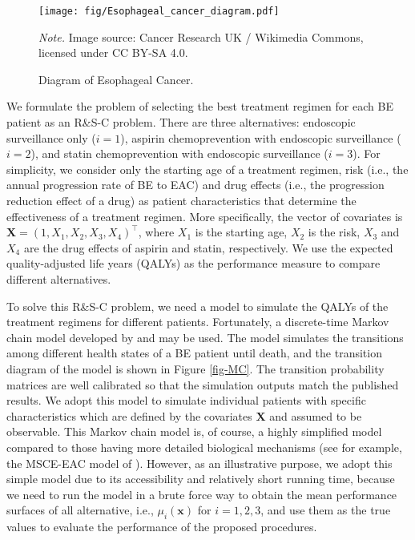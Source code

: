 \documentclass[ijoc,nonblindrev]{informs3}
\def\bx{{\bm x}}
\def\bX{{\bm X}}
\begin{document}
\begin{figure}%
\centering
\texttt{[image: fig/Esophageal\_cancer\_diagram.pdf]}
\caption{Diagram of Esophageal Cancer.}  \label{fig-cancer}
\begin{minipage}[t]{1\linewidth}
\SingleSpacedXI
\vspace{-1.2em}
\footnotesize{
\emph{Note.} \textsf{Image source: Cancer Research UK / Wikimedia Commons, licensed under CC BY-SA 4.0.}
}
\end{minipage}
\end{figure}

We formulate the problem of selecting the best treatment regimen for each BE patient as an R\&S-C problem.
There are three alternatives: endoscopic surveillance only ($i=1$), aspirin chemoprevention with endoscopic surveillance ($i=2$), and statin chemoprevention with endoscopic surveillance ($i=3$).
For simplicity, we consider only the starting age of a treatment regimen, risk (i.e., the annual progression rate of BE to EAC) and drug effects (i.e., the progression reduction effect of a drug) as patient characteristics that determine the effectiveness of a treatment regimen.
More specifically, the vector of covariates is $\bX=(1,X_1, X_2, X_3,X_4)^\intercal $, where $X_1$ is the starting age, $X_2$ is the risk, $X_3$ and $X_4$ are the drug effects of aspirin and statin, respectively.
We use the expected quality-adjusted life years (QALYs) as the performance measure to compare different alternatives.


To solve this R\&S-C problem, we need a model to simulate the QALYs of the treatment regimens for different patients.
Fortunately, a discrete-time Markov chain model developed by \cite{hur2004} and \cite{choi2014} may be used.
The model simulates the transitions among different health states of a BE patient until death, and the transition diagram of the model is shown in Figure \ref{fig-MC}.
The transition probability matrices are well calibrated so that the simulation outputs match the published results.
We adopt this model to simulate individual patients with specific characteristics which are defined by the covariates $\bX$ and assumed to be observable.
This Markov chain model is, of course, a highly simplified model compared to those having more detailed biological mechanisms (see for example, the MSCE-EAC model of \cite{curtius2015}).
However, as an illustrative purpose, we adopt this simple model due to its accessibility and relatively short running time,
because we need to run the model in a brute force way to obtain the mean performance surfaces of all alternative, i.e., $\mu_i(\bx)$ for $i=1,2,3$,
and use them as the true values to evaluate the performance of the proposed procedures.
\end{document}
